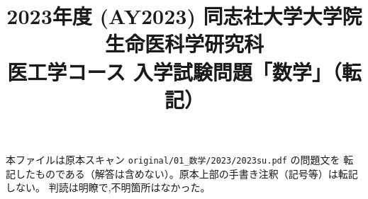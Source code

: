 \documentclass[11pt,a4paper]{article}
\title{2023年度 (AY2023) 同志社大学大学院 生命医科学研究科\\
医工学コース 入学試験問題「数学」（転記）}
\author{}
\date{}
\begin{document}
\maketitle
\vspace{-3em}

\begin{rem}
本ファイルは原本スキャン \texttt{original/01\_数学/2023/2023su.pdf} の問題文を
転記したものである（解答は含めない）。原本上部の手書き注釈（記号等）は転記しない。
判読は明瞭で,不明箇所はなかった。
\end{rem}

\bigskip

\bigskip

\bigskip

\bigskip

\end{document}

